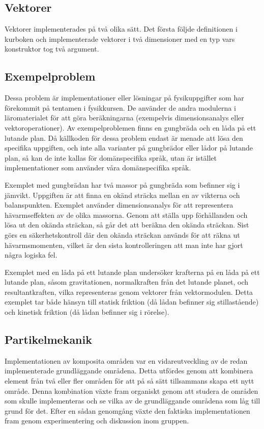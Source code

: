 \subsection{Vektorer}

Vektorer implementerades på två olika sätt. Det första följde definitionen i
kurboken och implementerade vektorer i två dimensioner med en typ vars
konstruktor tog två argument.

\subsection{Exempelproblem}
\begin{binge}
Dessa problem är implementationer eller lösningar på fysikuppgifter som har förekommit på tentamen i fysikkursen. De använder de andra modulerna i läromaterialet för att göra beräkningarna (exempelvis dimensionsanalys eller vektoroperationer). Av exempelproblemen finns en gungbräda och en låda på ett lutande plan. Då källkoden för dessa problem endast är menade att lösa den specifika uppgiften, och inte alla varianter på gungbrädor eller lådor på lutande plan, så kan de inte kallas för domänspecifika språk, utan är istället implementationer som använder våra domänspecifika språk.

Exemplet med gungbrädan har två massor på gungbräda som befinner sig i jämvikt. Uppgiften är att finna en okänd sträcka mellan en av vikterna och balanspunkten. Exemplet använder dimensionsanalys för att representera hävarmseffekten av de olika massorna. Genom att ställa upp förhållanden och lösa ut den okända sträckan, så går det att beräkna den okända sträckan. Sist görs en säkerhetskontroll där den okända sträckan används för att räkna ut hävarmsmomenten, vilket är den sista kontrolleringen att man inte har gjort några logiska fel.


Exemplet med en låda på ett lutande plan undersöker krafterna på en låda på ett lutande plan, såsom gravitationen, normalkraften från det lutande planet, och resultantkraften, vilka representeras genom vektorer från vektormodulen. Detta exemplet tar både hänsyn till statisk friktion (då lådan befinner sig stillastående) och kinetisk friktion (då lådan befinner sig i rörelse).

\end{binge}
\subsection{Partikelmekanik}

Implementationen av komposita områden var en vidareutveckling av de redan
implementerade grundläggande områdena. Detta utfördes genom att kombinera
element från två eller fler områden för att på så sätt tillsammans skapa ett
nytt område. Denna kombination växte fram organiskt genom att studera de områden
som skulle implementeras och se vilka av de grundläggande områdena som
låg till grund för det. Efter en sådan genomgång växte den faktiska
implementationen fram genom experimentering och diskussion inom gruppen.


